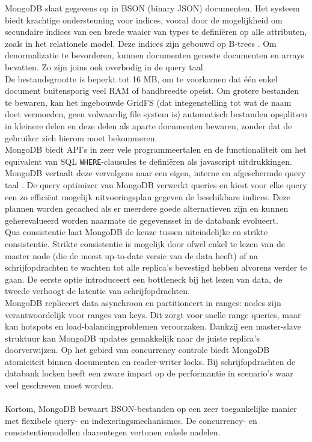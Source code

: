 MongoDB slaat gegevens op in BSON (binary JSON) documenten. Het systeem biedt krachtige ondersteuning voor indices, vooral door de mogelijkheid om secundaire indices van een brede waaier van types te defini\"eren op alle attributen, zoals in het relationele model. Deze indices zijn gebouwd op B-trees \cite{mongodb_indexes}. Om denormalizatie te bevorderen, kunnen documenten geneste documenten en arrays bevatten. Zo zijn joins ook overbodig in de query taal.\\
De bestandsgrootte is beperkt tot 16 MB, om te voorkomen dat \'e\'en enkel document buitensporig veel RAM of bandbreedte opeist. Om grotere bestanden te bewaren, kan het ingebouwde GridFS (dat integenstelling tot wat de naam doet vermoeden, geen volwaardig file system is) automatisch bestanden opsplitsen in kleinere delen en deze delen als aparte documenten bewaren, zonder dat de gebruiker zich hierom moet bekommeren.\\
MongoDB biedt API's in zeer vele programmeertalen en de functionaliteit om het equivalent van SQL \texttt{WHERE}-clausules te defini\"eren als javascript uitdrukkingen. MongoDB vertaalt deze vervolgens naar een eigen, interne en afgeschermde query taal \cite{grolinger2013data}. De query optimizer van MongoDB verwerkt queries en kiest voor elke query een zo effici\"ent mogelijk uitvoeringsplan gegeven de beschikbare indices. Deze plannen worden gecached als er meerdere goede alternatieven zijn en kunnen geherevalueerd worden naarmate de gegevensset in de databank evolueert.\\
Qua consistentie laat MongoDB de keuze tussen uiteindelijke en strikte consistentie. Strikte consistentie is mogelijk door ofwel enkel te lezen van de master node (die de meest up-to-date versie van de data heeft) of na schrijfopdrachten te wachten tot alle replica's bevestigd hebben alvorens verder te gaan. De eerste optie introduceert een bottleneck bij het lezen van data, de tweede verhoogt de latentie van schrijfopdrachten.\\
MongoDB repliceert data asynchroon en partitioneert in ranges: nodes zijn verantwoordelijk voor ranges van keys. Dit zorgt voor snelle range queries, maar kan hotspots en load-balancingproblemen veroorzaken. Dankzij een master-slave struktuur kan MongoDB updates gemakkelijk naar de juiste replica's doorverwijzen.
Op het gebied van concurrency controle biedt MongoDB atomiciteit binnen documenten en reader-writer locks. Bij schrijfopdrachten de databank locken heeft een zware impact op de performantie in scenario's waar veel geschreven moet worden.\\\\
Kortom, MongoDB bewaart BSON-bestanden op een zeer toegankelijke manier met flexibele query- en indexeringsmechanismes. De concurrency- en consistentiemodellen daarentegen vertonen enkele nadelen.

